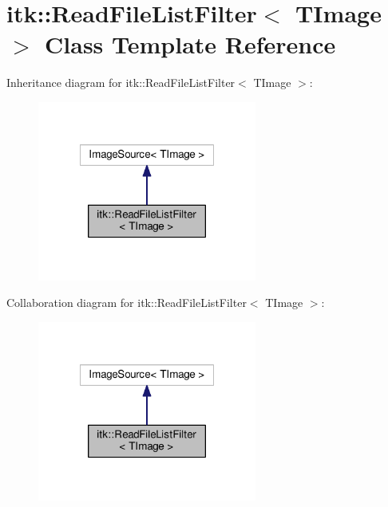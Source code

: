 \hypertarget{classitk_1_1_read_file_list_filter}{\section{itk\-:\-:Read\-File\-List\-Filter$<$ T\-Image $>$ Class Template Reference}
\label{classitk_1_1_read_file_list_filter}
}


Inheritance diagram for itk\-:\-:Read\-File\-List\-Filter$<$ T\-Image $>$\-:
\nopagebreak
\begin{figure}[H]
\begin{center}
\leavevmode
\includegraphics[width=204pt]{classitk_1_1_read_file_list_filter__inherit__graph}
\end{center}
\end{figure}


Collaboration diagram for itk\-:\-:Read\-File\-List\-Filter$<$ T\-Image $>$\-:
\nopagebreak
\begin{figure}[H]
\begin{center}
\leavevmode
\includegraphics[width=204pt]{classitk_1_1_read_file_list_filter__coll__graph}
\end{center}
\end{figure}
